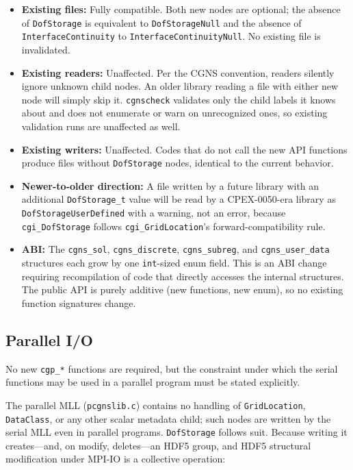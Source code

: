 \documentclass[11pt,letterpaper]{article}
\begin{document}
\begin{itemize}[leftmargin=2em]
\item \textbf{Existing files:} Fully compatible.  Both new nodes are
  optional; the absence of \texttt{DofStorage} is equivalent to
  \texttt{DofStorageNull} and the absence of
  \texttt{InterfaceContinuity} to
  \texttt{InterfaceContinuityNull}.  No existing file is invalidated.

\item \textbf{Existing readers:} Unaffected.  Per the CGNS convention,
  readers silently ignore unknown child nodes.  An older library
  reading a file with either new node will simply skip it.  \texttt{cgnscheck} validates only the child
  labels it knows about and does not enumerate or warn on unrecognized
  ones, so existing validation runs are unaffected as well.

\item \textbf{Existing writers:} Unaffected.  Codes that do not call
  the new API functions produce files without
  \texttt{DofStorage} nodes, identical to the current
  behavior.

\item \textbf{Newer-to-older direction:} A file written by a future
  library with an additional \texttt{DofStorage\_t} value will be read
  by a CPEX-0050-era library as \texttt{DofStorageUserDefined} with a
  warning, not an error, because \texttt{cgi\_DofStorage} follows
  \texttt{cgi\_GridLocation}'s forward-compatibility rule.

\item \textbf{ABI:} The \texttt{cgns\_sol}, \texttt{cgns\_discrete},
  \texttt{cgns\_subreg}, and \texttt{cgns\_user\_data} structures each
  grow by one \texttt{int}-sized enum field.
  This is an ABI change requiring recompilation of code that directly
  accesses the internal structures.  The public API is purely additive
  (new functions, new enum), so no existing function signatures change.
\end{itemize}

\subsection{Parallel I/O}

No new \texttt{cgp\_*} functions are required, but the constraint under
which the serial functions may be used in a parallel program must be
stated explicitly.

The parallel MLL (\texttt{pcgnslib.c}) contains no handling of
\texttt{GridLocation}, \texttt{DataClass}, or any other scalar metadata
child; such nodes are written by the serial MLL even in parallel
programs.  \texttt{DofStorage} follows suit.  Because writing it
creates---and, on modify, deletes---an HDF5 group, and HDF5 structural
modification under MPI-IO is a collective operation:
\end{document}
